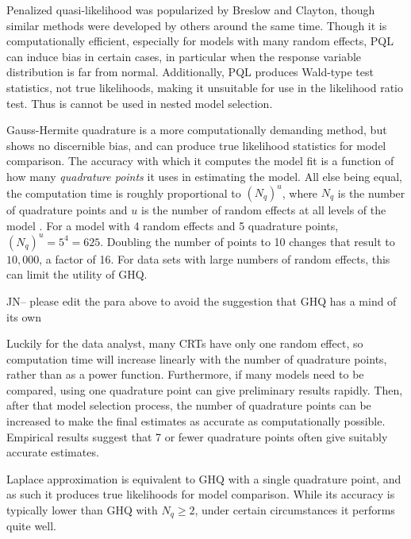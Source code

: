 \documentclass{article}
\begin{document}
\begin{flushleft}
Penalized quasi-likelihood was popularized by Breslow and Clayton\cite{breslow_approximate_1993}, though similar methods were developed by others\cite{zeger_models_1988}\cite{engel_simple_1994} around the same time. Though it is computationally efficient, especially for models with many random effects, PQL can induce bias in certain cases, in particular when the response variable distribution is far from normal\cite{agresti_categorical_2013}\cite{rodriguez_assessment_1995}\cite{breslow_bias_1995}\cite{lin_bias_1996}. Additionally, PQL produces Wald-type test statistics, not true likelihoods, making it unsuitable for use in the likelihood ratio test.  Thus is cannot be used in nested model selection\cite{zhang_fitting_2011}\cite{pinheiro_efficient_2006}\cite{ng_estimation_2006}.

Gauss-Hermite quadrature is a more computationally demanding method, but shows no discernible bias, and can produce true likelihood statistics for model comparison. The accuracy with which it computes the model fit is a function of how many \textit{quadrature points} it uses in estimating the model. All else being equal, the computation time is roughly proportional to $(N_q)^u$, where $N_q$ is the number of quadrature points and $u$ is the number of random effects at all levels of the model \cite{statacorp_stata_2017}\cite{pinheiro_efficient_2006}. For a model with 4 random effects and 5 quadrature points, $(N_q)^u = 5^4 = 625$. Doubling the number of points to 10 changes that result to $10,000$, a factor of 16. For data sets with large numbers of random effects, this can limit the utility of GHQ.

JN-- please edit the para above to avoid the suggestion that GHQ has a mind of its own

Luckily for the data analyst, many CRTs have only one random effect, so computation time will increase linearly with the number of quadrature points, rather than as a power function. Furthermore, if many models need to be compared, using one quadrature point can give preliminary results rapidly. Then, after that model selection process, the number of quadrature points can be increased to make the final estimates as accurate as computationally possible. Empirical results suggest that 7 or fewer quadrature points often give suitably accurate estimates\cite{pinheiro_approximations_1995}.

Laplace approximation is equivalent to GHQ with a single quadrature point\cite{liu_note_1994}, and as such it produces true likelihoods for model comparison. While its accuracy is typically lower than GHQ with $N_q\geq2$, under certain circumstances it performs quite well\cite{liu_note_1994}.


\end{flushleft}
\end{document}
